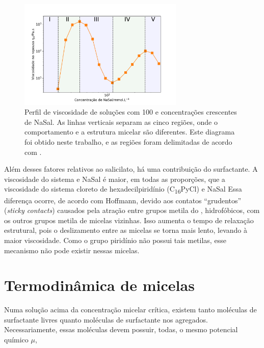		\begin{figure}[h]
			\centering
			\includegraphics[width=0.7\textwidth]{imagens/reologia/regioes_RH}
			\caption{Perfil de viscosidade de soluções com \CTAB{} 100 \mM{} e concentrações crescentes de NaSal. As linhas verticais separam as cinco regiões, onde o comportamento e a estrutura micelar são diferentes. Este diagrama foi obtido neste trabalho, e as regiões foram delimitadas de acordo com \citeauthor{Rehage1988}.}
			\label{fig:regioes_rh}
		\end{figure}

		Além desses fatores relativos ao salicilato, há uma contribuição do surfactante. A viscosidade do sistema \CTAB{} e NaSal é maior, em todas as proporções, que a viscosidade do sistema cloreto de hexadecilpiridínio (C\textsubscript{16}PyCl) e NaSal \cite{Lutz-Bueno2017}
		Essa diferença ocorre, de acordo com Hoffmann,\cite{Hoffmann2010, Hoffmann2012a, Yamashita2006} devido aos contatos ``grudentos'' (\emph{sticky contacts}) causados pela atração entre grupos metila do \CTAB, hidrofóbicos, com os outros grupos metila de micelas vizinhas. Isso aumenta o tempo de relaxação estrutural, pois o deslizamento entre as micelas se torna mais lento, levando à maior viscosidade. Como o grupo piridínio não possui tais metilas, esse mecanismo não pode existir nessas micelas.  
		

		\section{Termodinâmica de micelas} 
		
		Numa solução acima da concentração micelar crítica, existem tanto moléculas de surfactante livres quanto moléculas de surfactante nos agregados. Necessariamente, essas moléculas devem possuir, todas, o mesmo potencial químico \(\mu\), \cite{Israelachvili2011}
		
